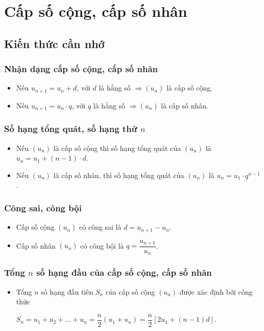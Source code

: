 \setcounter{ex}{0}
\section{Cấp số cộng, cấp số nhân}
\subsection{Kiến thức cần nhớ}
\begin{khung}
	\subsubsection{Nhận dạng cấp số cộng, cấp số nhân}
	\begin{itemize}
		\item Nếu $u_{n+1}=u_n+d$, với $d$ là hằng số $\Rightarrow \left(u_n \right)$ là cấp số cộng.
		\item Nếu $u_{n+1}=u_n\cdot q$, với $q$ là hằng số $\Rightarrow \left(u_n \right)$ là cấp số nhân.
	\end{itemize}
	\subsubsection{Số hạng tổng quát, số hạng thứ $n$}
	\begin{itemize}
		\item Nếu $\left(u_n\right)$ là cấp số cộng thì số hạng tổng quát của $\left(u_n\right)$ là $u_n=u_1+\left(n-1 \right)\cdot d$.
		\item Nếu $\left(u_n \right)$ là cấp số nhân, thì số hạng tổng quát của $\left(u_n\right)$ là $u_n=u_1\cdot q^{n-1}$.
	\end{itemize}
	\subsubsection{Công sai, công bội}
	\begin{itemize}
		\item Cấp số cộng $\left(u_n \right)$ có công sai là $d=u_{n+1}-u_n$.
		\item Cấp số nhân $\left(u_n\right)$ có công bội là $q=\dfrac{u_{n+1}}{u_n}$.
	\end{itemize}
	\subsubsection{Tổng $n$ số hạng đầu của cấp số cộng, cấp số nhân}
	\begin{itemize}
		\item Tổng $n$ số hạng đầu tiên $S_n$ của cấp số cộng $\left(u_n \right)$ được xác định bởi công thức
		\begin{center}
			\begin{tcolorbox}
				\begin{center}
					$S_n=u_1+u_2+\ldots+u_n=\dfrac{n}{2}\left( u_1+u_n \right)=\dfrac{n}{2}\left[ 2u_1+\left( n-1 \right)d \right].$
				\end{center}
			\end{tcolorbox}
			

\end{center}
\end{itemize}
\end{khung}
